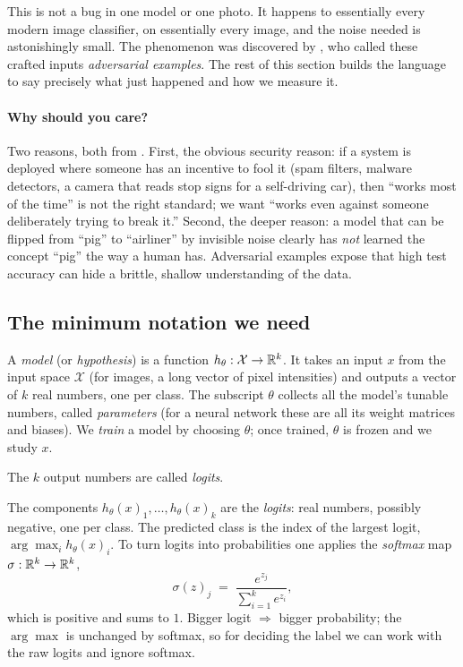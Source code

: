 This is not a bug in one model or one photo. It happens to essentially every modern image classifier, on essentially every image, and the noise needed is astonishingly small. The phenomenon was discovered by \citet{szegedy2014intriguing}, who called these crafted inputs \emph{adversarial examples}. The rest of this section builds the language to say precisely what just happened and how we measure it.

\paragraph{Why should you care?} Two reasons, both from \citet{kolter2018adversarial}. First, the obvious security reason: if a system is deployed where someone has an incentive to fool it (spam filters, malware detectors, a camera that reads stop signs for a self-driving car), then ``works most of the time'' is not the right standard; we want ``works even against someone deliberately trying to break it.'' Second, the deeper reason: a model that can be flipped from ``pig'' to ``airliner'' by invisible noise clearly has \emph{not} learned the concept ``pig'' the way a human has. Adversarial examples expose that high test accuracy can hide a brittle, shallow understanding of the data.

\subsection{The minimum notation we need}
\label{sub:notation}

\begin{definition}
A \emph{model} (or \emph{hypothesis}) is a function $h_\theta : \mathcal X \to \mathbb{R}^k$. It takes an input $x$ from the input space $\mathcal X$ (for images, a long vector of pixel intensities) and outputs a vector of $k$ real numbers, one per class. The subscript $\theta$ collects all the model's tunable numbers, called \emph{parameters} (for a neural network these are all its weight matrices and biases). We \emph{train} a model by choosing $\theta$; once trained, $\theta$ is frozen and we study $x$.
\end{definition}

The $k$ output numbers are called \emph{logits}.

\begin{definition}
The components $h_\theta(x)_1,\dots,h_\theta(x)_k$ are the \emph{logits}: real numbers, possibly negative, one per class. The predicted class is the index of the largest logit, $\arg\max_i h_\theta(x)_i$. To turn logits into probabilities one applies the \emph{softmax} map $\sigma:\mathbb{R}^k\to\mathbb{R}^k$,
\[
  \sigma(z)_j \;=\; \frac{e^{z_j}}{\sum_{i=1}^{k} e^{z_i}},
\]
which is positive and sums to $1$. Bigger logit $\Rightarrow$ bigger probability; the $\arg\max$ is unchanged by softmax, so for deciding the label we can work with the raw logits and ignore softmax.
\end{definition}

